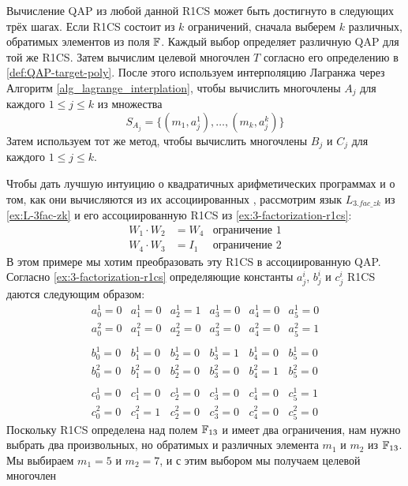 Вычисление QAP из любой данной R1CS может быть достигнуто в следующих трёх шагах. Если R1CS состоит из $k$ ограничений, сначала выберем $k$ различных, обратимых элементов из поля $\mathbb{F}$. Каждый выбор определяет различную QAP для той же R1CS. Затем вычислим целевой многочлен $T$ согласно его определению в \ref{def:QAP-target-poly}. После этого используем интерполяцию Лагранжа через Алгоритм \ref{alg_lagrange_interplation}, чтобы вычислить многочлены $A_j$ для каждого $1\leq j \leq k$ из множества
\begin{equation}
S_{A_j} = \{(m_1,a^1_j),\ldots,(m_k,a^k_j)\}
\end{equation}
Затем используем тот же метод, чтобы вычислить многочлены $B_j$ и $C_j$ для каждого $1\leq j \leq k$.
\begin{example}[3-factorization]
\label{ex:3-fac-QAP}  Чтобы дать лучшую интуицию о квадратичных арифметических программах и о том, как они вычисляются из их ассоциированных , рассмотрим язык $L_{3.fac\_zk}$ из \examplename{} \ref{ex:L-3fac-zk} и его ассоциированную R1CS из \examplename{} \ref{ex:3-factorization-r1cs}:
\begin{align*}
W_1 \cdot W_2 & = W_4 & \text{ограничение } 1\\
W_4 \cdot W_3 & = I_1 & \text{ограничение } 2
\end{align*}
В этом примере мы хотим преобразовать эту R1CS в ассоциированную QAP. Согласно \examplename{} \ref{ex:3-factorization-r1cs} определяющие константы $a_j^i$, $b_j^i$ и $c_j^i$ R1CS даются следующим образом:
$$
\begin{array}{llllll}
a_0^1 = 0 & a_1^1= 0 & a_2^1= 1 & a_3^1 = 0 & a_4^1= 0  & a_5^1= 0 \\ 
a_0^2 = 0 & a_1^2= 0 & a_2^2= 0 & a_3^2 = 0 & a_4^2= 0  & a_5^2= 1 \\ 
\\
b_0^1 = 0 & b_1^1= 0 & b_2^1= 0 & b_3^1 = 1 & b_4^1= 0  & b_5^1= 0 \\ 
b_0^2 = 0 & b_1^2= 0 & b_2^2= 0 & b_3^2 = 0 & b_4^2= 1  & b_5^2= 0 \\ 
\\
c_0^1 = 0 & c_1^1= 0 & c_2^1= 0 & c_3^1 = 0 & c_4^1= 0  & c_5^1= 1 \\ 
c_0^2 = 0 & c_1^2= 1 & c_2^2= 0 & c_3^2 = 0 & c_4^2= 0  & c_5^2= 0 
\end{array} 
$$
Поскольку R1CS определена над полем $\mathbb{F}_{13}$ и имеет два ограничения, нам нужно выбрать два произвольных, но обратимых и различных элемента $m_1$ и $m_2$ из $\mathbb{F}_{13}$. Мы выбираем $m_{1}=5$ и $m_{2}=7$, и с этим выбором мы получаем целевой многочлен

\end{example}
